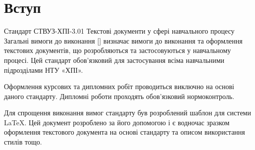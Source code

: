 \section*{Вступ}

Стандарт СТВУЗ-ХПІ-3.01 Текстові документи у сфері навчального процесу Загальні вимоги до виконання [] визначає вимоги до виконання та оформлення текстових документів, що розробляються та застосовуються у навчальному процесі. Цей стандарт обов’язковий для застосування всіма навчальними підрозділами НТУ «ХПІ».

Оформлення курсових та дипломних робіт проводиться виключно на основі даного стандарту. Дипломні роботи проходять обов’язковий нормоконтроль.

Для спрощення виконання вимог стандарту був розроблений шаблон для системи \LaTeX{}. Цей документ розроблено за його допомогою і є водночас  зразком оформлення текстового документа на основі стандарту та описом використання стилів тощо.

